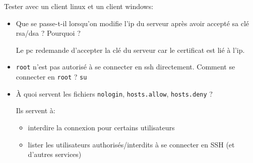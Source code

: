 \documentclass[a4paper]{article}
\begin{document}
Tester avec un client linux et un client windows:
\begin{itemize}

\item Que se passe-t-il lorsqu'on modifie l'ip du serveur après avoir accepté sa clé rsa/dsa ? Pourquoi ?
\begin{example}
    Le pc redemande d'accepter la clé du serveur car le certificat est lié à l'ip.
\end{example}

\item \texttt{root} n'est pas autorisé à se connecter en ssh directement. Comment se connecter en \texttt{root} ? \texttt{su}

\item À quoi servent les fichiers \texttt{nologin}, \texttt{hosts.allow}, \texttt{hosts.deny} ?
\begin{example}
    Ils servent à:
    \begin{itemize}
        \item interdire la connexion pour certains utilisateurs
        \item lister les utilisateurs authorisés/interdits à se connecter en SSH (et d'autres services)
    \end{itemize}
\end{example}


\end{itemize}
\end{document}
